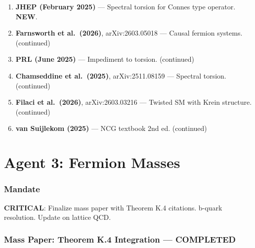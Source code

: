 \documentclass[11pt,a4paper]{article}
\newcommand{\NEW}{\textcolor{dfdblue}{\textbf{NEW}}}
\begin{document}
\begin{enumerate}
\item \textbf{JHEP (February 2025)} --- Spectral torsion for Connes type operator. \NEW.
\item \textbf{Farnsworth et al.\ (2026)}, arXiv:2603.05018 --- Causal fermion systems. (continued)
\item \textbf{PRL (June 2025)} --- Impediment to torsion. (continued)
\item \textbf{Chamseddine et al.\ (2025)}, arXiv:2511.08159 --- Spectral torsion. (continued)
\item \textbf{Filaci et al.\ (2026)}, arXiv:2603.03216 --- Twisted SM with Krein structure. (continued)
\item \textbf{van Suijlekom (2025)} --- NCG textbook 2nd ed. (continued)
\end{enumerate}


\part{Agent 3: Fermion Masses}
\label{part:agent3}

\section{Mandate}

\textbf{CRITICAL}: Finalize mass paper with Theorem K.4 citations. b-quark resolution. Update on lattice QCD.

\section{Mass Paper: Theorem K.4 Integration --- COMPLETED}
\end{document}
